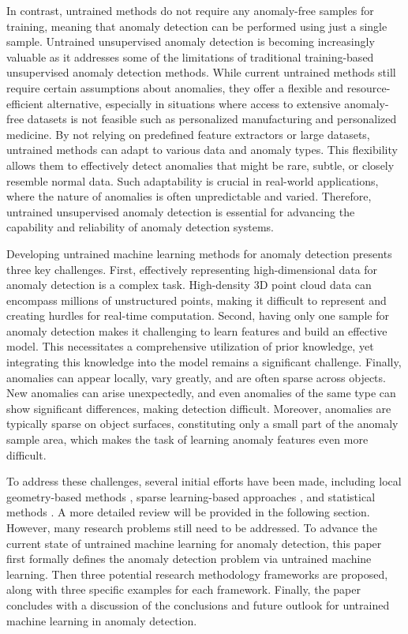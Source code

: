 In contrast, untrained methods do not require any anomaly-free samples for training, meaning that anomaly detection can be performed using just a single sample. Untrained unsupervised anomaly detection is becoming increasingly valuable as it addresses some of the limitations of traditional training-based unsupervised anomaly detection methods. While current untrained methods still require certain assumptions about anomalies, they offer a flexible and resource-efficient alternative, especially in situations where access to extensive anomaly-free datasets is not feasible such as personalized manufacturing and personalized medicine. By not relying on predefined feature extractors or large datasets, untrained methods can adapt to various data and anomaly types. This flexibility allows them to effectively detect anomalies that might be rare, subtle, or closely resemble normal data. Such adaptability is crucial in real-world applications, where the nature of anomalies is often unpredictable and varied. Therefore, untrained unsupervised anomaly detection is essential for advancing the capability and reliability of anomaly detection systems.

Developing untrained machine learning methods for anomaly detection presents three key challenges. First, effectively representing high-dimensional data for anomaly detection is a complex task. High-density 3D point cloud data can encompass millions of unstructured points, making it difficult to represent and creating hurdles for real-time computation. Second, having only one sample for anomaly detection makes it challenging to learn features and build an effective model. This necessitates a comprehensive utilization of prior knowledge, yet integrating this knowledge into the model remains a significant challenge. Finally, anomalies can appear locally, vary greatly, and are often sparse across objects. New anomalies can arise unexpectedly, and even anomalies of the same type can show significant differences, making detection difficult. Moreover, anomalies are typically sparse on object surfaces, constituting only a small part of the anomaly sample area, which makes the task of learning anomaly features even more difficult.

To address these challenges, several initial efforts have been made, including local geometry-based methods \cite{wang2023mvgcn}, sparse learning-based approaches \cite{tao2025pointsgrade}, and statistical methods \cite{tao2023anomaly}. A more detailed review will be provided in the following section. However, many research problems still need to be addressed. To advance the current state of untrained machine learning for anomaly detection, this paper first formally defines the anomaly detection problem via untrained machine learning. Then three potential research methodology frameworks are proposed, along with three specific examples for each framework. Finally, the paper concludes with a discussion of the conclusions and future outlook for untrained machine learning in anomaly detection.

